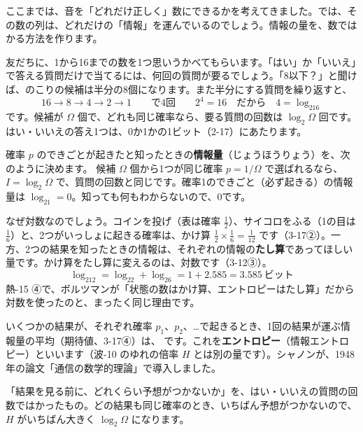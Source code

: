 \label{ph:波-11:sec9}
ここまでは、音を「どれだけ正しく」数にできるかを考えてきました。では、その数の列は、どれだけの「情報」を運んでいるのでしょう。情報の量を、数ではかる方法を作ります。

友だちに、1から16までの数を1つ思いうかべてもらいます。「はい」か「いいえ」で答える質問だけで当てるには、何回の質問が要るでしょう。「8以下？」と聞けば、のこりの候補は半分の8個になります。また半分にする質問を繰り返すと、
\[16\to8\to4\to2\to1\qquad\text{で4回}\qquad 2^4=16\quad\text{だから}\quad4=\log_216\]
です。候補が $\Omega$ 個で、どれも同じ確率なら、要る質問の回数は $\log_2\Omega$ 回です。はい・いいえの答え1つは、0か1かの1ビット（2-17）にあたります。

確率 $p$ のできごとが起きたと知ったときの\textbf{情報量}（じょうほうりょう）を、次のように決めます。
\label{ph:波-11:info}候補 $\Omega$ 個から1つが同じ確率 $p=1/\Omega$ で選ばれるなら、$I=\log_2\Omega$ で、質問の回数と同じです。確率1のできごと（必ず起きる）の情報量は $\log_21=0$。知っても何もわからないので、0です。

なぜ対数なのでしょう。コインを投げ（表は確率 $\tfrac12$）、サイコロをふる（1の目は $\tfrac16$）と、2つがいっしょに起きる確率は、かけ算 $\tfrac12\times\tfrac16=\tfrac1{12}$ です（3-17②）。一方、2つの結果を知ったときの情報は、それぞれの情報の\textbf{たし算}であってほしい量です。かけ算をたし算に変えるのは、対数です（3-12③）。
\[\log_212=\log_22+\log_26=1+2.585=3.585\ \text{ビット}\]
熱-15 ④で、ボルツマンが「状態の数はかけ算、エントロピーはたし算」だから対数を使ったのと、まったく同じ理由です。

いくつかの結果が、それぞれ確率 $p_1$、$p_2$、…で起きるとき、1回の結果が運ぶ情報量の平均（期待値、3-17④）は、
\label{ph:波-11:entropy}です。これを\textbf{エントロピー}（情報エントロピー）といいます（波-10 のゆれの倍率 $H$ とは別の量です）。シャノンが、1948年の論文「通信の数学的理論」で導入しました。

\begin{phyomi}[$H=-\sum p_i\log_2p_i$]
「結果を見る前に、どれくらい予想がつかないか」を、はい・いいえの質問の回数ではかったもの。どの結果も同じ確率のとき、いちばん予想がつかないので、$H$ がいちばん大きく $\log_2\Omega$ になります。
\end{phyomi}

